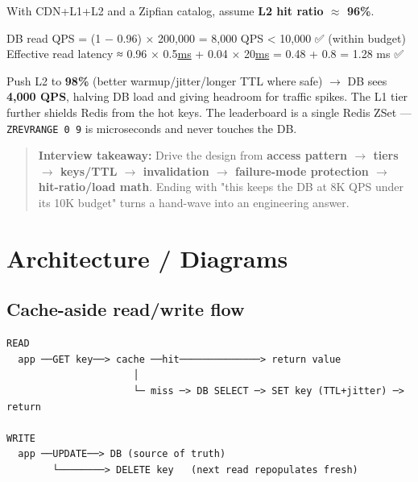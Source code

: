 \documentclass[11pt]{article}
\newenvironment{Shaded}{\begin{snugshade}}{\end{snugshade}}
\newcommand{\DecValTok}[1]{\textcolor[rgb]{0.96,0.45,0.00}{#1}}
\newcommand{\ErrorTok}[1]{\textcolor[rgb]{0.85,0.27,0.33}{\underline{#1}}}
\newcommand{\FloatTok}[1]{\textcolor[rgb]{0.96,0.45,0.00}{#1}}
\newcommand{\NormalTok}[1]{\textcolor[rgb]{0.81,0.81,0.76}{#1}}
\newcommand{\OperatorTok}[1]{\textcolor[rgb]{0.81,0.81,0.76}{#1}}
\begin{document}
With CDN+L1+L2 and a Zipfian catalog, assume \textbf{L2 hit ratio \(\approx\) 96\%}.


\begin{Shaded}
\begin{Highlighting}[]
\NormalTok{DB read QPS }\OperatorTok{=}\NormalTok{ (}\DecValTok{1}\NormalTok{ − }\FloatTok{0.96}\NormalTok{) × }\DecValTok{200}\NormalTok{,}\DecValTok{000} \OperatorTok{=} \DecValTok{8}\NormalTok{,}\DecValTok{000}\NormalTok{ QPS   }\OperatorTok{\textless{}} \DecValTok{10}\NormalTok{,}\DecValTok{000}\NormalTok{ ✅ (within budget)}
\NormalTok{Effective read latency ≈ }\FloatTok{0.96}\NormalTok{ × }\FloatTok{0.5}\ErrorTok{ms} \OperatorTok{+} \FloatTok{0.04}\NormalTok{ × }\DecValTok{20}\ErrorTok{ms} \OperatorTok{=} \FloatTok{0.48} \OperatorTok{+} \FloatTok{0.8} \OperatorTok{=} \FloatTok{1.28}\NormalTok{ ms  ✅}
\end{Highlighting}
\end{Shaded}

Push L2 to \textbf{98\%} (better warmup/jitter/longer TTL where safe) \(\rightarrow\) DB sees \textbf{4,000 QPS}, halving DB load and giving headroom for traffic spikes. The L1 tier further shields Redis from the hot keys. The leaderboard is a single Redis ZSet --- \texttt{ZREVRANGE\ 0\ 9} is microseconds and never touches the DB.

\begin{quote}
\textbf{Interview takeaway:} Drive the design from \textbf{access pattern \(\rightarrow\) tiers \(\rightarrow\) keys/TTL \(\rightarrow\) invalidation \(\rightarrow\) failure-mode protection \(\rightarrow\) hit-ratio/load math}. Ending with "this keeps the DB at 8K QPS under its 10K budget" turns a hand-wave into an engineering answer.
\end{quote}

\section{Architecture / Diagrams}\label{architecture--diagrams}

\subsection{Cache-aside read/write flow}\label{cache-aside-readwrite-flow}

\setcodelang{}

\begin{verbatim}
READ
  app ──GET key──> cache ──hit──────────────> return value
                      │
                      └─ miss ─> DB SELECT ─> SET key (TTL+jitter) ─> return

WRITE
  app ──UPDATE──> DB (source of truth)
        └────────> DELETE key   (next read repopulates fresh)
\end{verbatim}
\end{document}
